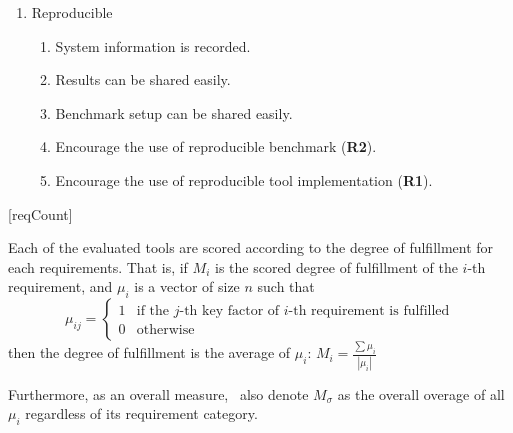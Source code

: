 \begin{enumerate}[noitemsep]
    \item Reproducible
    \begin{enumerate}[noitemsep]
        \item System information is recorded.
        \item Results can be shared easily.
        \item Benchmark setup can be shared easily.
        \item Encourage the use of reproducible benchmark (\textbf{R2}).
        \item Encourage the use of reproducible tool implementation (\textbf{R1}).
    \end{enumerate}
\end{enumerate}

[reqCount]
\newcommand{\reqLabel}[1]{
    \setcounter{reqFactorCount}{0}
    \addtocounter{reqCount}{1}
    \arabic{reqCount}.
    #1
}
\newcommand{\reqFactor}[1]{
    \addtocounter{reqFactorCount}{1}
    (\alph{reqFactorCount}) #1
}

Each of the evaluated tools are scored according to the degree of fulfillment for each requirements.
That is, if $M_i$ is the scored degree of fulfillment of the $i$-th requirement, and $\mu_{i}$ is a vector of size $n$ such that
\[
    \mu_{ij} =
    \begin{cases}
        1 & \text{if the $j$-th key factor of $i$-th requirement is fulfilled} \\
        0 & \text{otherwise}
    \end{cases}
\]
then the degree of fulfillment is the average of $\mu_i$:
\(
    M_i = \frac{\sum\mu_{i}}{|\mu_i|}
\)

Furthermore, as an overall measure, \first~also denote $M_\sigma$ as the overall overage of all $\mu_{i}$ regardless of its requirement category.


